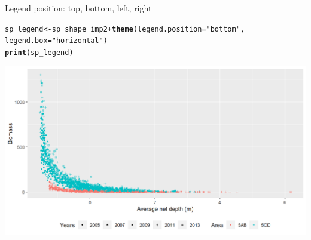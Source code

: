 \documentclass{beamer}\usepackage[]{graphicx}\usepackage[]{color}
\makeatletter
\newcommand{\hlstr}[1]{\textcolor[rgb]{0.192,0.494,0.8}{#1}}%
\newcommand{\hlopt}[1]{\textcolor[rgb]{0,0,0}{#1}}%
\newcommand{\hlstd}[1]{\textcolor[rgb]{0.345,0.345,0.345}{#1}}%
\newcommand{\hlkwb}[1]{\textcolor[rgb]{0.69,0.353,0.396}{#1}}%
\newcommand{\hlkwc}[1]{\textcolor[rgb]{0.333,0.667,0.333}{#1}}%
\newcommand{\hlkwd}[1]{\textcolor[rgb]{0.737,0.353,0.396}{\textbf{#1}}}%
\newenvironment{kframe}{%
 \def\at@end@of@kframe{}%
 \ifinner\ifhmode%
  \def\at@end@of@kframe{\end{minipage}}%
  \begin{minipage}{\columnwidth}%
 \fi\fi%
 \def\FrameCommand##1{\hskip\@totalleftmargin \hskip-\fboxsep
 \colorbox{shadecolor}{##1}\hskip-\fboxsep
     \hskip-\linewidth \hskip-\@totalleftmargin \hskip\columnwidth}%
 \MakeFramed {\advance\hsize-\width
   \@totalleftmargin\z@ \linewidth\hsize
   \@setminipage}}%
 {\par\unskip\endMakeFramed%
 \at@end@of@kframe}
\newenvironment{knitrout}{}{} %
\makeatother
\begin{document}

\begin{frame}[fragile]{Legend position: top, bottom, left, right}
\begin{knitrout}\footnotesize
{}\color{fgcolor}\begin{kframe}
\begin{alltt}
\hlstd{sp_legend} \hlkwb{<-} \hlstd{sp_shape_imp2} \hlopt{+} \hlkwd{theme}\hlstd{(}\hlkwc{legend.position}\hlstd{=}\hlstr{"bottom"}\hlstd{,}
                                   \hlkwc{legend.box} \hlstd{=} \hlstr{"horizontal"}\hlstd{)}
\hlkwd{print}\hlstd{(sp_legend)}
\end{alltt}
\end{kframe}

{\centering \includegraphics[width=.9\linewidth]{figure/legend_p1-1} 

}



\end{knitrout}
\end{frame}
\end{document}
